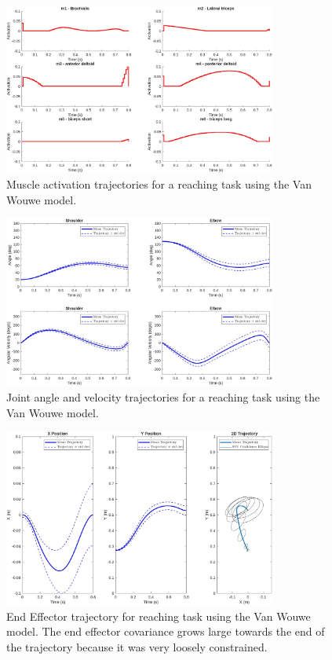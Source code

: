 \documentclass[table,12pt]{article}
\begin{document}
\begin{figure}[H]
    \centering
    \includegraphics[width=0.8\textwidth]{demo_new_state_activations.jpg}
    \caption{Muscle activation trajectories for a reaching task using the Van Wouwe model.}
    \label{fig:demo_activations}
\end{figure}

\begin{figure}[H]
    \centering
    \includegraphics[width=0.8\textwidth]{demo_new_state_joints.jpg}
    \caption{Joint angle and velocity trajectories for a reaching task using the Van Wouwe model.}
    \label{fig:demo_joints}
\end{figure}

\begin{figure}[H]
    \centering
    \includegraphics[width=0.8\textwidth]{demo_new_state_positions.jpg}
    \caption{End Effector trajectory for reaching task using the Van Wouwe model. The end effector covariance grows large towards the end of the trajectory because it was very loosely constrained.}
    \label{fig:demo_position}
\end{figure}
\end{document}
